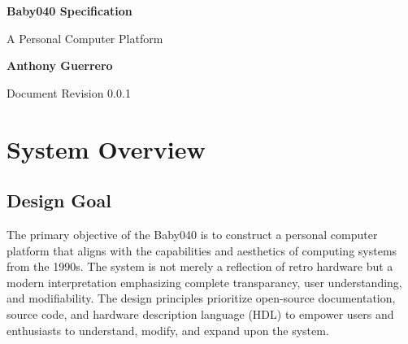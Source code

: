\documentclass{article}
\newcommand{\systemname}[0]{Baby040\xspace}
\begin{document}
\begin{titlepage}
	\begin{center}
		\vspace*{1cm}

		\Huge
		\textbf{\systemname Specification}

		\vspace{0.5cm}
		\LARGE
		A Personal Computer Platform

		\vspace{1.5cm}
		\textbf{Anthony Guerrero}

		\vfill

		\normalsize
		Document Revision 0.0.1

		\vspace{0.8cm}
	\end{center}
\end{titlepage}

\section{System Overview}

\subsection{Design Goal}
The primary objective of the \systemname is to construct a personal computer
platform that aligns with the capabilities and aesthetics of computing systems
from the 1990s. The system is not merely a reflection of retro hardware but a
modern interpretation emphasizing complete transparancy, user understanding,
and modifiability. The design principles prioritize open-source documentation,
source code, and hardware description language (HDL) to empower users and
enthusiasts to understand, modify, and expand upon the system.
\end{document}
